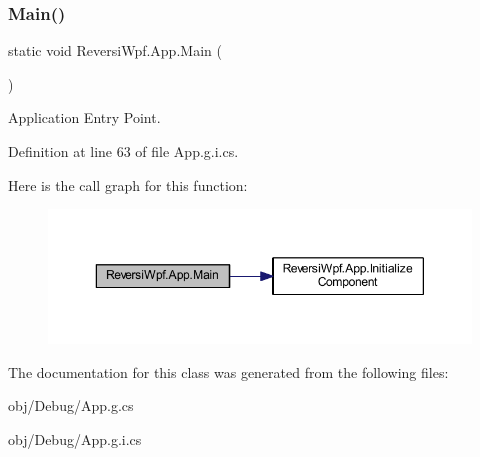 \subsubsection{\texorpdfstring{Main()}{Main()}\hspace{0.1cm}{\footnotesize\ttfamily [4/4]}}
{\footnotesize\ttfamily static void Reversi\+Wpf.\+App.\+Main (\begin{DoxyParamCaption}{ }\end{DoxyParamCaption})\hspace{0.3cm}{\ttfamily [static]}}



Application Entry Point. 



Definition at line 63 of file App.\+g.\+i.\+cs.

Here is the call graph for this function\+:
\nopagebreak
\begin{figure}[H]
\begin{center}
\leavevmode
\includegraphics[width=350pt]{class_reversi_wpf_1_1_app_a21f38c0f40a47a04302edeeb7bf005f8_cgraph}
\end{center}
\end{figure}


The documentation for this class was generated from the following files\+:\begin{DoxyCompactItemize}
\item 
obj/\+Debug/App.\+g.\+cs\item 
obj/\+Debug/App.\+g.\+i.\+cs\end{DoxyCompactItemize}
